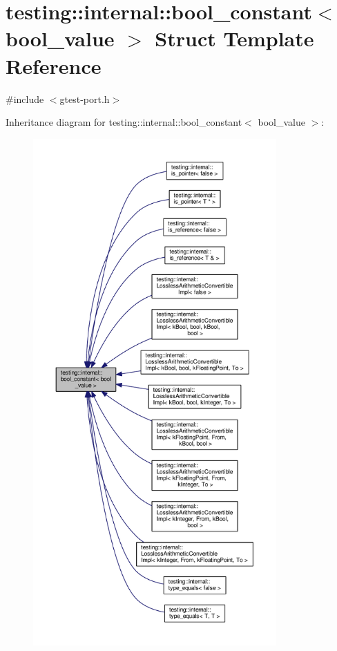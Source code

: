 \hypertarget{structtesting_1_1internal_1_1bool__constant}{}\section{testing\+:\+:internal\+:\+:bool\+\_\+constant$<$ bool\+\_\+value $>$ Struct Template Reference}
\label{structtesting_1_1internal_1_1bool__constant}


{\ttfamily \#include $<$gtest-\/port.\+h$>$}



Inheritance diagram for testing\+:\+:internal\+:\+:bool\+\_\+constant$<$ bool\+\_\+value $>$\+:
\nopagebreak
\begin{figure}[H]
\begin{center}
\leavevmode
\includegraphics[height=550pt]{structtesting_1_1internal_1_1bool__constant__inherit__graph}
\end{center}
\end{figure}
